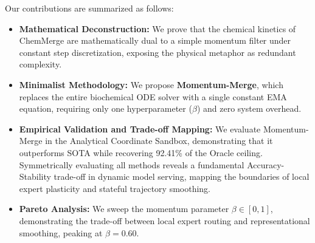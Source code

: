 Our contributions are summarized as follows:
\begin{itemize}
    \item \textbf{Mathematical Deconstruction:} We prove that the chemical kinetics of ChemMerge are mathematically dual to a simple momentum filter under constant step discretization, exposing the physical metaphor as redundant complexity.
    \item \textbf{Minimalist Methodology:} We propose \textbf{Momentum-Merge}, which replaces the entire biochemical ODE solver with a single constant EMA equation, requiring only one hyperparameter ($\beta$) and zero system overhead.
    \item \textbf{Empirical Validation and Trade-off Mapping:} We evaluate Momentum-Merge in the Analytical Coordinate Sandbox, demonstrating that it outperforms SOTA while recovering 92.41\% of the Oracle ceiling. Symmetrically evaluating all methods reveals a fundamental Accuracy-Stability trade-off in dynamic model serving, mapping the boundaries of local expert plasticity and stateful trajectory smoothing.
    \item \textbf{Pareto Analysis:} We sweep the momentum parameter $\beta \in [0, 1]$, demonstrating the trade-off between local expert routing and representational smoothing, peaking at $\beta = 0.60$.
\end{itemize}
